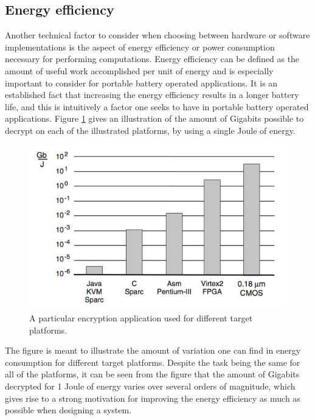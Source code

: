 \subsection{Energy efficiency}
Another technical factor to consider when choosing between hardware or software implementations is the aspect of energy efficiency or power consumption necessary for performing computations. Energy efficiency can be defined as the amount of useful work accomplished per unit of energy and is especially important to consider for portable battery operated applications. It is an established fact that increasing the energy efficiency results in a longer battery life, and this is intuitively a factor one seeks to have in portable battery operated applications. Figure \ref{Energyefficiency} gives an illustration of the amount of Gigabits possible to decrypt on each of the illustrated platforms, by using a single Joule of energy. 

\begin{figure}[H]
    \begin{center}
        \includegraphics[scale=0.52]{Attachments/Energyefficiency.png}
        \caption{A particular encryption application used for different target platforms. }
        \label{Energyefficiency}
    \end{center}
\end{figure}

\noindent
The figure is meant to illustrate the amount of variation one can find in energy consumption for different target platforms. Despite the task being the same for all of the platforms, it can be seen from the figure that the amount of Gigabits decrypted for 1 Joule of energy varies over several orders of magnitude, which gives rise to a strong motivation for improving the energy efficiency as much as possible when designing a system. 
\\
\noindent
